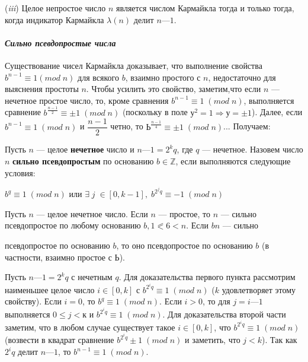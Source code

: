   	({\it iii}) Целое непростое число $n$ является числом Кармайкла тогда и  	только тогда, когда индикатор Кармайкла $\lambda(n)$ делит $n — 1$.
  	\paragraph{{\it Сильно псевдопростые числа}} 
  	\noindent
  	
  	Существование чисел Кармайкла доказывает, что выполнение свой­ства $b^{n-1} \equiv 1 (mod \;n)$ для всякого $b$, взаимно простого с $n$, недостаточно для выяснения простоты $n$. Чтобы усилить это свойство, заметим,что если $n$ — нечетное простое число, то, кроме сравнения $b^{n-1}\equiv1\;(mod\;n)$,	 выполняется сравнение $b^{\frac{n-1}{2}}\equiv\pm 1 \;(mod\;n)$ (поскольку в поле $у^2=1 \Rightarrow у = \pm 1$). Далее, если $b^{n-1}\equiv1\;(mod\;n)$ и $\dfrac{n-1}{2}$ четно, то $Ь^{\frac{n-1}{4}} \equiv \pm 1\;(mod\;n)$... Получаем:
  	
  	\begin{determ} 
  	\noindent

  	Пусть $n$ — целое {\bf нечетное} число и $n — 1 = 2^kq$, где $q$ — нечетное.	Назовем число $n$ {\bf сильно псевдопростым} по основанию $b \in \mathbb Z$, если	выполняются следующие условия:
  	
  	\begin{center}
  		$b^q\equiv1 \; (mod\;n)$ или $\exists\;j\;\in [0,k-1],\; b^{2^{j}q}\equiv-1\;(mod\;n)$
  	\end{center}
  	\end{determ}
  
  	\begin{predl} 
  	\noindent

  	Пусть $n$ — целое нечетное число. Если $n$ — простое, то $n$ — сильно псевдопростое по любому основанию $b, 1 \eqslantless6<n$. Если $bn$ — сильно 
  
  	\pagebreak 
  	
  	\noindent
  	псевдопростое по основанию $b$, то оно псевдопростое по основанию $b$ (в частности, взаимно простое с $Ь$).
	\end{predl}
  	
  	\begin{myproof} 
  	\noindent
  	
  	
  		Пусть $n — 1 = 2^kq$ с нечетным $q$. Для доказательства первого пункта рассмотрим наименьшее целое число $i \in [0, k]$ с $b^{2^{i}q} \equiv 1\;(mod\;n)$ ($k$ удовлетворяет этому свойству). Если $i = 0$, то $b^q \equiv 1\;(mod\;n)$. Если	$i > 0$, то для $j = i — 1$ выполняется $0 \leqslant j < к$ и $b^{2^{i}q} \equiv 1\;(mod\;n)$.	Для доказательства второй части заметим, что в любом случае существует такое $i \in [0, k]$, что $b^{2^{i}q} \equiv 1\;(mod\;n)$ (возвести в квадрат
  		сравнение $b^{2^{i}q} \pm 1\;(mod\;n)$ и заметить, что $j < k$). Так как $2^{i}q$ делит $n — 1$, то $b^{n-1} \equiv 1\;(mod \;n)$.

  		
  	\end{myproof}	
  	
